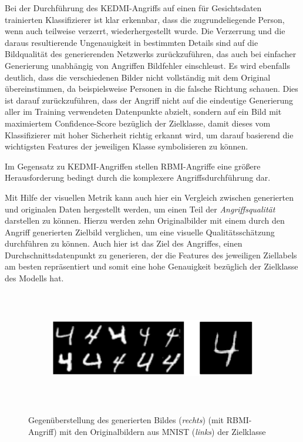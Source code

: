 Bei der Durchführung des \glqq KEDMI\grqq-Angriffs auf einen für Gesichtsdaten trainierten Klassifizierer ist klar erkennbar, dass die zugrundeliegende Person, wenn auch teilweise verzerrt, wiederhergestellt wurde. Die Verzerrung und die daraus resultierende Ungenauigkeit in bestimmten Details sind auf die Bildqualität des generierenden Netzwerks zurückzuführen, das auch bei einfacher Generierung unabhängig von Angriffen Bildfehler einschleust. Es wird ebenfalls deutlich, dass die verschiedenen Bilder nicht vollständig mit dem Original übereinstimmen, da beispielsweise Personen in die \glqq falsche\grqq{} Richtung schauen. Dies ist darauf zurückzuführen, dass der Angriff nicht auf die eindeutige Generierung aller im Training verwendeten Datenpunkte abzielt, sondern auf ein Bild mit maximiertem Confidence-Score bezüglich der Zielklasse, damit dieses vom Klassifizierer mit hoher Sicherheit richtig erkannt wird, um darauf basierend die wichtigsten Features der jeweiligen Klasse symbolisieren zu können. 

Im Gegensatz zu \glqq KEDMI\grqq-Angriffen stellen \glqq RBMI\grqq-Angriffe eine größere Herausforderung bedingt durch die komplexere Angriffsdurchführung dar. 

Mit Hilfe der visuellen Metrik kann auch hier ein Vergleich zwischen generierten und originalen Daten hergestellt werden, um einen Teil der \textit{Angriffsqualität} darstellen zu können. Hierzu werden zehn Originalbilder mit einem durch den Angriff generierten Zielbild verglichen, um eine visuelle Qualitätsschätzung durchführen zu können. Auch hier ist das Ziel des Angriffes, einen \glqq Durchschnittsdatenpunkt\grqq{} zu generieren, der die Features des jeweiligen Ziellabels am besten repräsentiert und somit eine hohe Genauigkeit bezüglich der Zielklasse des Modells hat. 

\begin{figure}[H]
	\centering
	\begin{subfigure}[b]{0.8\linewidth}
		\includegraphics[width=\linewidth, height=5cm, keepaspectratio]{Bilder/4_mnist_rbmi.png}
	\end{subfigure}
	\caption{Gegenüberstellung des generierten Bildes (\textit{rechts}) (mit \glqq RBMI\grqq-Angriff) mit den Originalbildern aus MNIST (\textit{links}) der Zielklasse}
	\label{img:rbmi_visual_mnist}
\end{figure}

